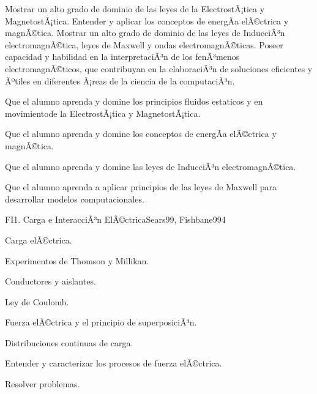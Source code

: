 \begin{syllabus}


\begin{justification}
Mostrar un alto grado de dominio de las leyes de la ElectrostÃ¡tica y MagnetostÃ¡tica. Entender y aplicar los conceptos de energÃ­a elÃ©ctrica y magnÃ©tica. Mostrar un alto grado de dominio de las leyes de InducciÃ³n electromagnÃ©tica, leyes de Maxwell y ondas electromagnÃ©ticas. Poseer capacidad y habilidad en la interpretaciÃ³n de los fenÃ³menos electromagnÃ©ticos, que contribuyan en la elaboraciÃ³n de soluciones eficientes y Ãºtiles en diferentes Ã¡reas de la ciencia de la computaciÃ³n. 
\end{justification}

\begin{goals}
\item  Que el alumno aprenda y domine los principios fluidos estaticos y en movimientode la ElectrostÃ¡tica y MagnetostÃ¡tica.
\item  Que el alumno aprenda y domine los conceptos de energÃ­a elÃ©ctrica y magnÃ©tica.
\item  Que el alumno aprenda y domine las leyes de InducciÃ³n electromagnÃ©tica.
\item  Que el alumno aprenda a aplicar principios de las leyes de Maxwell para desarrollar modelos computacionales.
\end{goals}

\begin{outcomes}
\end{outcomes}

\begin{unit}{FI1. Carga e InteracciÃ³n ElÃ©ctrica}{Sears99, Fishbane99}{4}
   \begin{topics}
         \item  Carga elÃ©ctrica.
	 \item  Experimentos de Thomson y Millikan.
         \item  Conductores y aislantes.
	 \item  Ley de Coulomb.
         \item  Fuerza elÃ©ctrica y el principio de superposiciÃ³n.
         \item  Distribuciones continuas de carga.
   \end{topics}

   \begin{unitgoals}
         \item  Entender y caracterizar los procesos de fuerza elÃ©ctrica.
         \item  Resolver problemas.
   \end{unitgoals}
\end{unit}


\end{syllabus}
